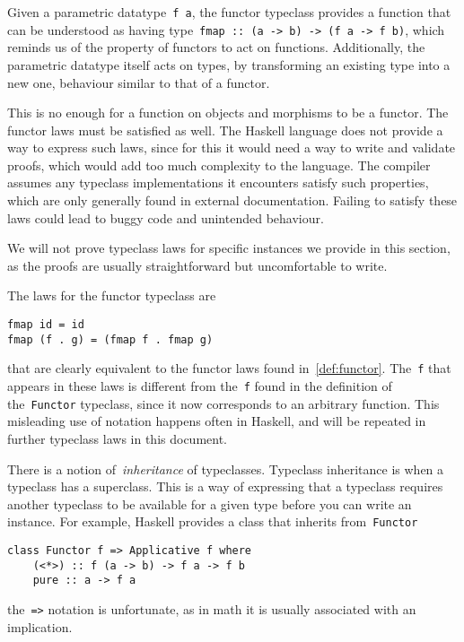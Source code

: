 \documentclass[a4paper]{article}
\theoremstyle{plain}
\theoremstyle{definition}
\begin{document}
Given a parametric datatype~\texttt{f a}, the functor typeclass
provides a function that can be understood as having
type~\texttt{fmap :: (a -> b) -> (f a -> f b)}, which reminds us of
the property of functors to act on functions. Additionally, the parametric
datatype itself acts on types, by transforming an existing type into a new one,
behaviour similar to that of a functor.

This is no enough for a function on objects and morphisms to be a functor. The
functor laws must be satisfied as well. The Haskell language does not provide a
way to express such laws, since for this it would need a way to write and
validate proofs, which would add too much complexity to the language. The
compiler assumes any typeclass implementations it encounters satisfy such
properties, which are only generally found in external documentation. Failing to
satisfy these laws could lead to buggy code and unintended behaviour.

We will not prove typeclass laws for specific instances we provide in this
section, as the proofs are usually straightforward but uncomfortable to write.

The laws for the functor typeclass are
\begin{verbatim}
fmap id = id
fmap (f . g) = (fmap f . fmap g)
\end{verbatim}
that are clearly equivalent to the functor laws found in~\ref{def:functor}.
The~\texttt{f} that appears in these laws is different from
the~\texttt{f} found in the definition of
the~\texttt{Functor} typeclass, since it now corresponds to an
arbitrary function. This misleading use of notation happens often in Haskell,
and will be repeated in further typeclass laws in this document.

There is a notion of~\emph{inheritance} of typeclasses. Typeclass inheritance is
when a typeclass has a superclass. This is a way of expressing that a typeclass
requires another typeclass to be available for a given type before you can write
an instance. For example, Haskell provides a class that inherits
from~\texttt{Functor}
\begin{verbatim}
class Functor f => Applicative f where
    (<*>) :: f (a -> b) -> f a -> f b
    pure :: a -> f a
\end{verbatim}
the~\texttt{=>} notation is unfortunate, as in math it is usually
associated with an implication.
\end{document}
